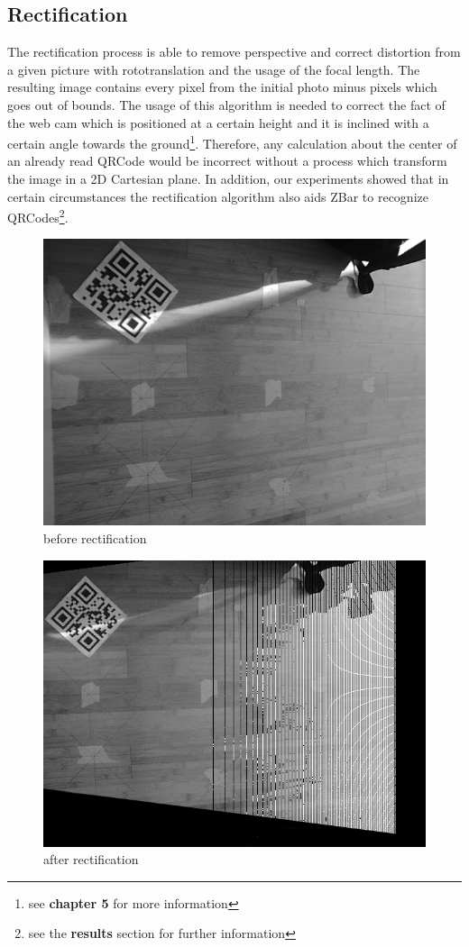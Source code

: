 \subsection{Rectification}
The rectification process is able to remove perspective and correct distortion from a given picture with rototranslation and the usage of the focal length. The resulting image contains every pixel from the initial photo minus pixels which goes out of bounds. The usage of this algorithm is needed to correct the fact of the web cam which is positioned at a certain height and it is inclined with a certain angle towards the ground\footnote{see \textbf{chapter 5} for more information}. Therefore, any calculation about the center of an already read QRCode would be incorrect without a process which transform the image in a 2D Cartesian plane. In addition, our experiments showed that in certain circumstances the rectification algorithm also aids ZBar to recognize QRCodes\footnote{see the \textbf{results} section for further information}. 
\vspace{1.25cm}
\begin{figure}[hbt]
    \centering
    \includegraphics[scale=0.3]{img/beforerect.png}
    \caption{before rectification}
\end{figure}
\begin{figure}[hbt]
    \centering
    \includegraphics[scale=0.3]{img/afterrect.png}
    \caption{after rectification}
\end{figure}




 
